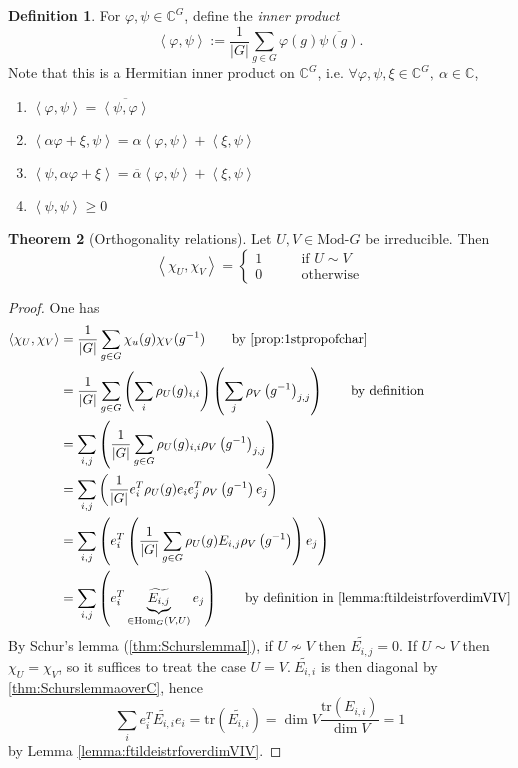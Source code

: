 \documentclass[a4paper]{article}
\newcommand{\tr}{\text{tr}}
\newcommand{\la}{\left\langle}
\newcommand{\ra}{\right\rangle}
\newcommand{\C}{\mathbb{C}}
\newcommand{\Hom}{\text{Hom}}
\newcommand{\Mod}{\text{Mod-}}
\theoremstyle{definition}
\newtheorem{defn}{Definition}[subsection]
\newtheorem{thm}[defn]{Theorem}
\begin{document}
\begin{defn}
For $\varphi,\psi\in\C^G$, define the \textit{inner product}
\[
\la \varphi,\psi\ra:=\frac{1}{|G|}\sum_{g\in G}\varphi(g)\overline{\psi(g)}.
\]
Note that this is a Hermitian inner product on $\C^G$, i.e. $\forall\varphi,\psi,\xi\in\C^G,\ \alpha\in\C$,
\begin{enumerate}
\item $\la\varphi,\psi\ra=\overline{\la\psi,\varphi\ra}$
\item $\la\alpha\varphi+\xi,\psi\ra=\alpha\la\varphi,\psi\ra+\la\xi,\psi\ra$
\item $\la\psi,\alpha\varphi+\xi\ra=\overline\alpha\la\varphi,\psi\ra+\la\xi,\psi\ra$
\item $\la\psi,\psi\ra\geq 0$
\end{enumerate}
\end{defn}

\begin{thm}[Orthogonality relations]
\label{thm:orthogonalityrelations}
Let $U,V\in\Mod G$ be irreducible. Then
\[
\la\chi_U,\chi_V\ra=\left\{ \begin{aligned}
  1 \qquad &\text{if }U\sim V\\
  0 \qquad &\text{otherwise}
\end{aligned} \right.
\]
\end{thm}
\begin{proof}
One has
\[
\begin{aligned}
\la\chi_U,\chi_V\ra&=\frac{1}{|G|}\sum_{g\in G}\chi_u(g)\chi_V(g^{-1}) \qquad \text{by \ref{prop:1stpropofchar}}\\
&=\frac{1}{|G|}\sum_{g\in G} \left(\sum_i\rho_U(g)_{i,i}\right)\left(\sum_j\rho_V\left(g^{-1}\right)_{j,j}\right)\qquad \text{by definition}\\
&=\sum_{i,j}\left(\frac{1}{|G|}\sum_{g\in G}\rho_U(g)_{i,i}\rho_V\left(g^{-1}\right)_{j,j}\right)\\
&=\sum_{i,j}\left(\frac{1}{|G|}e_i^T\rho_U(g)e_ie_j^T\rho_V\left(g^{-1}\right)e_j\right)\\
&=\sum_{i,j}\left(e_i^T\left(\frac{1}{|G|}\sum_{g\in G}\rho_U(g)E_{i,j}\rho_V\left(g^{-1}\right)\right)e_j\right)\\
&=\sum_{i,j}\left(e_i^T\underbrace{\widetilde{E_{i,j}}}_{\in\Hom_G(V,U)}e_j\right) \qquad \text{by definition in \ref{lemma:ftildeistrfoverdimVIV}}
\end{aligned}
\]
By Schur's lemma (\ref{thm:SchurslemmaI}), if $U\not\sim V$ then $\widetilde{E_{i,j}}=0$. If $U\sim V$ then $\chi_U=\chi_V$, so it suffices to treat the case $U=V.\ \widetilde{E_{i,i}}$ is then diagonal by \ref{thm:SchurslemmaoverC}, hence
\[
\sum_i e_i^T\widetilde{E_{i,i}}e_i=\tr\left(\widetilde{E_{i,i}}\right)=\dim V\frac{\tr(E_{i,i})}{\dim V}=1
\]
by Lemma \ref{lemma:ftildeistrfoverdimVIV}.
\end{proof}
\end{document}
